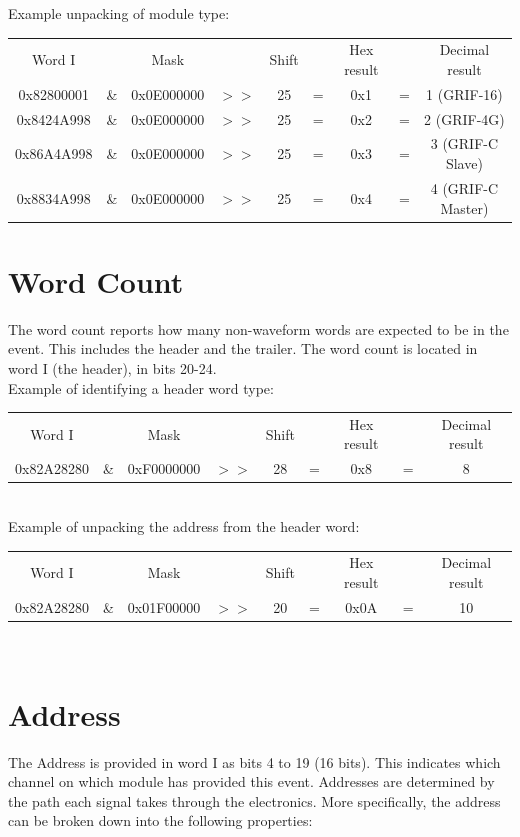 \documentclass[letterpaper,12pt,notitlepage]{report}
\begin{document}
Example unpacking of module type:\\

\begin{tabular}{ccccccccc}
Word I &  & Mask & & Shift & & Hex result & & Decimal result\\
0x82800001 & \& & 0x0E000000 & $>>$ & 25 & = & 0x1 & = & 1 (GRIF-16)\\
0x8424A998 & \& & 0x0E000000 & $>>$ & 25 & = & 0x2 & = & 2 (GRIF-4G)\\
0x86A4A998 & \& & 0x0E000000 & $>>$ & 25 & = & 0x3 & = & 3 (GRIF-C Slave)\\
0x8834A998 & \& & 0x0E000000 & $>>$ & 25 & = & 0x4 & = & 4 (GRIF-C Master)\\
\end{tabular}

\section{Word Count}
The word count reports how many non-waveform words are expected to be in the event. This includes the header and the trailer. The word count is located in word I (the header), in bits 20-24.\\

Example of identifying a header word type:\\

\begin{tabular}{ccccccccc}
Word I &  & Mask & & Shift & & Hex result & & Decimal result\\
0x82A28280 & \& & 0xF0000000 & $>>$ & 28 & = & 0x8 & = & 8\\
\end{tabular}\\

Example of unpacking the address from the header word:\\
\begin{tabular}{ccccccccc}
Word I &  & Mask & & Shift & & Hex result & & Decimal result\\
0x82A28280 & \& & 0x01F00000 & $>>$ & 20 & = & 0x0A & = & 10\\
\end{tabular}\\

\section{Address}
The Address is provided in word I as bits 4 to 19 (16 bits). This indicates which channel on which module has provided this event. Addresses are determined by the path each signal takes through the electronics. More specifically, the address can be broken down into the following properties:\\
\end{document}
